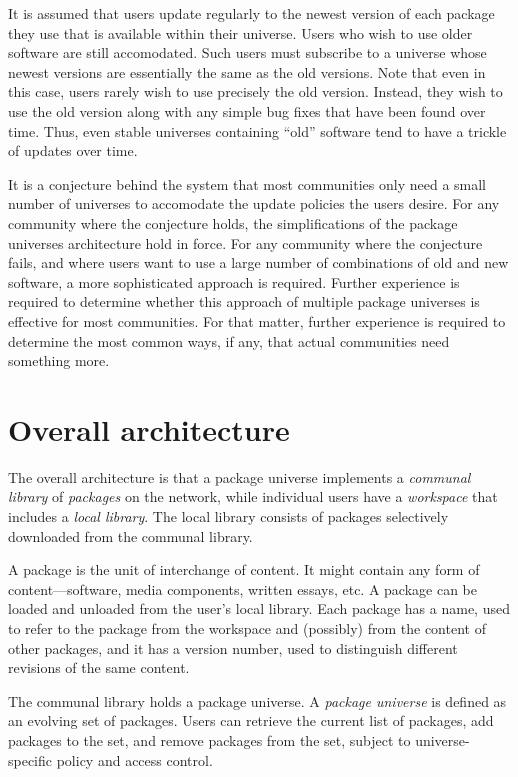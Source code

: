 \documentclass{article}
\begin{document}
It is assumed that users update regularly to the newest version of
each package they use that is available within their universe.  Users
who wish to use older software are still accomodated.  Such users must
subscribe to a universe whose newest versions are essentially the same
as the old versions.  Note that even in this case, users rarely wish
to use precisely the old version.  Instead, they wish to use the old
version along with any simple bug fixes that have been found over
time.  Thus, even stable universes containing ``old'' software tend to
have a trickle of updates over time.

It is a conjecture behind the system that most communities only need a
small number of universes to accomodate the update policies the users
desire.  For any community where the conjecture holds, the
simplifications of the package universes architecture hold in force.
For any community where the conjecture fails, and where users want to
use a large number of combinations of old and new software, a more
sophisticated approach is required.  Further experience is required to
determine whether this approach of multiple package universes is
effective for most communities.  For that matter, further experience
is required to determine the most common ways, if any, that actual
communities need something more.


\section{Overall architecture}

The overall architecture is that a package universe implements a
\emph{communal library} of \emph{packages} on the network, while
individual users have a \emph{workspace} that includes a \emph{local
library}.  The local library consists of packages selectively
downloaded from the communal library.

A package is the unit of interchange of content.  It might contain any
form of content---software, media components, written essays, etc.  A
package can be loaded and unloaded from the user's local library.
Each package has a name, used to refer to the package from the
workspace and (possibly) from the content of other packages, and it
has a version number, used to distinguish different revisions of the same
content.

The communal library holds a package universe.  A \emph{package
universe} is defined as an evolving set of packages.  Users can
retrieve the current list of packages, add packages to the set, and
remove packages from the set, subject to universe-specific policy and
access control.
\end{document}
